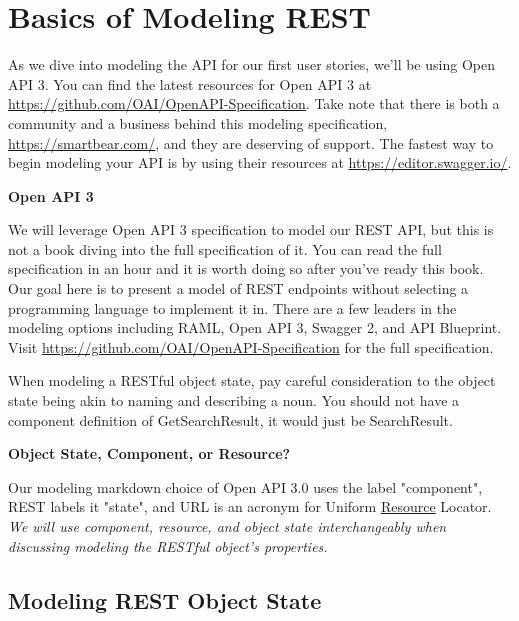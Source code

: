 \chapter{Basics of Modeling REST}

As we dive into modeling the API for our first user stories, we'll be using Open API 3.  You can find the latest resources for Open API 3 at \url{https://github.com/OAI/OpenAPI-Specification}.  Take note that there is both a community and a business behind this modeling specification, \url{https://smartbear.com/}, and they are deserving of support.  The fastest way to begin modeling your API is by using their resources at \url{https://editor.swagger.io/}.

\begin{sidebar}
\begin{center}
\textbf{Open API 3}
\end{center}

We will leverage Open API 3 specification to model our REST API, but this is not a book diving into the full specification of it.  You can read the full specification in an hour and it is worth doing so after you've ready this book.  Our goal here is to present a model of REST endpoints without selecting a programming language to implement it in.  There are a few leaders in the modeling options including RAML, Open API 3, Swagger 2, and API Blueprint.  Visit \url{https://github.com/OAI/OpenAPI-Specification} for the full specification.

\end{sidebar}

When modeling a RESTful object state, pay careful consideration to the object state being akin to naming and describing a noun.  You should not have a component definition of GetSearchResult, it would just be SearchResult.

\begin{sidebar}
\begin{center}
\textbf{Object State, Component, or Resource?}
\end{center}

Our modeling markdown choice of Open API 3.0 uses the label "component", REST labels it "state", and URL is an acronym for Uniform \underline{Resource} Locator.  \textit{We will use component, resource, and object state interchangeably when discussing modeling the RESTful object's properties.}

\end{sidebar}

\section{Modeling REST Object State}

